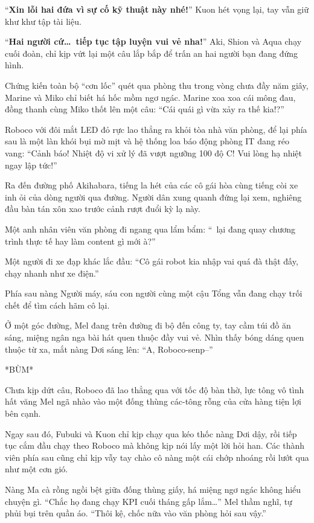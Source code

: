 \documentclass[../main.tex]{subfiles}
\begin{document}
``\textbf{Xin lỗi hai đứa vì sự cố kỹ thuật này nhé!}'' Kuon hét vọng lại, tay vẫn giữ khư khư tập tài liệu.

``\textbf{Hai người cứ\dots\ tiếp tục tập luyện vui vẻ nha!}'' Aki, Shion và Aqua chạy cuối đoàn, chỉ kịp vứt lại một câu lắp bắp để trấn an hai người bạn đang đứng hình.

Chứng kiến toàn bộ ``cơn lốc'' quét qua phòng thu trong vòng chưa đầy năm giây, Marine và Miko chỉ biết há hốc mồm ngơ ngác. Marine xoa xoa cái mông đau, đồng thanh cùng Miko thốt lên một câu: ``Cái quái gì vừa xảy ra thế kia!?''

Roboco với đôi mắt LED đỏ rực lao thẳng ra khỏi tòa nhà văn phòng, để lại phía sau là một làn khói bụi mờ mịt và hệ thống loa báo động phòng IT đang réo vang: ``Cảnh báo! Nhiệt độ vi xử lý đã vượt ngưỡng 100 độ C! Vui lòng hạ nhiệt ngay lập tức!''

Ra đến đường phố Akihabara, tiếng la hét của các cô gái hòa cùng tiếng còi xe inh ỏi của dòng người qua đường. Người dân xung quanh đứng lại xem, nghiêng đầu bàn tán xôn xao trước cảnh rượt đuổi kỳ lạ này.

Một anh nhân viên văn phòng đi ngang qua lẩm bẩm: ``\hll\ lại đang quay chương trình thực tế hay làm content gì mới à?''

Một người đi xe đạp khác lắc đầu: ``Cô gái robot kia nhập vai quá đà thật đấy, chạy nhanh như xe điện.''

Phía sau nàng Người máy, sáu con người cùng một cậu Tổng vẫn đang chạy trối chết để tìm cách hãm cô lại.

Ở một góc đường, Mel đang trên đường đi bộ đến công ty, tay cầm túi đồ ăn sáng, miệng ngân nga bài hát quen thuộc đầy vui vẻ. Nhìn thấy bóng dáng quen thuộc từ xa, mắt nàng Dơi sáng lên: ``A, Roboco-senp--''

*BÙM*

Chưa kịp dứt câu, Roboco đã lao thẳng qua với tốc độ bàn thờ, lực tông vô tình hất văng Mel ngã nhào vào một đống thùng các-tông rỗng của cửa hàng tiện lợi bên cạnh.

Ngay sau đó, Fubuki và Kuon chỉ kịp chạy qua kéo thốc nàng Dơi dậy, rồi tiếp tục cắm đầu chạy theo Roboco mà không kịp nói lấy một lời hỏi han. Các thành viên phía sau cũng chỉ kịp vẫy tay chào cô nàng một cái chớp nhoáng rồi lướt qua như một cơn gió.

Nàng Ma cà rồng ngồi bệt giữa đống thùng giấy, há miệng ngơ ngác không hiểu chuyện gì. ``Chắc họ đang chạy KPI cuối tháng gấp lắm\dots'' Mel thầm nghĩ, tự phủi bụi trên quần áo. ``Thôi kệ, chốc nữa vào văn phòng hỏi sau vậy.''
\end{document}

